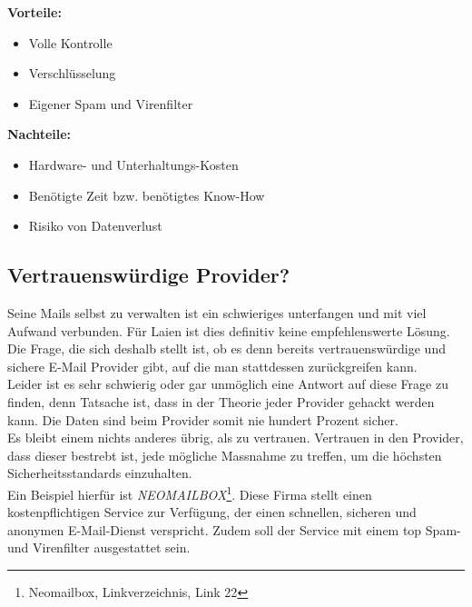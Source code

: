 \textbf{Vorteile:}
\begin{itemize}
    \item Volle Kontrolle
    \item Verschlüsselung
    \item Eigener Spam und Virenfilter
\end{itemize}

\textbf{Nachteile:}
\begin{itemize}
    \item Hardware- und Unterhaltungs-Kosten
    \item Benötigte Zeit bzw. benötigtes Know-How
    \item Risiko von Datenverlust
\end{itemize}

\subsection{Vertrauenswürdige Provider?}
Seine Mails selbst zu verwalten ist ein schwieriges unterfangen und mit viel Aufwand verbunden. Für Laien ist dies definitiv keine empfehlenswerte Lösung. Die Frage, die sich deshalb stellt ist, ob es denn bereits vertrauenswürdige und sichere E-Mail Provider gibt, auf die man stattdessen zurückgreifen kann. \\
Leider ist es sehr schwierig oder gar unmöglich eine Antwort auf diese Frage zu finden, denn Tatsache ist, dass in der Theorie jeder Provider gehackt werden kann. Die Daten sind beim Provider somit nie hundert Prozent sicher. \\
Es bleibt einem nichts anderes übrig, als zu vertrauen. Vertrauen in den Provider, dass dieser bestrebt ist, jede mögliche Massnahme zu treffen, um die höchsten Sicherheitsstandards einzuhalten. \\
Ein Beispiel hierfür ist \textit{NEOMAILBOX}\footnote{Neomailbox, Linkverzeichnis, Link 22}. Diese Firma stellt einen kostenpflichtigen Service zur Verfügung, der einen schnellen, sicheren und anonymen E-Mail-Dienst verspricht. Zudem soll der Service mit einem top Spam- und Virenfilter ausgestattet sein.
